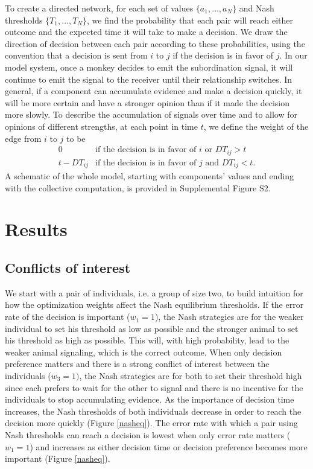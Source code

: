 \documentclass{pnastwo}
\begin{document}
\begin{article}
To create a directed network, for each set of values $\{a_1,\dots,a_N\}$ and Nash thresholds $\{T_1,\dots,T_N\}$, we find the probability that each pair will reach either outcome and the expected time it will take to make a decision.  We draw the direction of decision between each pair according to these probabilities, using the convention that a decision is sent from $i$ to $j$ if the decision is in favor of $j$.  In our model system, once a monkey decides to emit the subordination signal, it will continue to emit the signal to the receiver until their relationship switches.  In general, if a component can accumulate evidence and make a decision quickly, it will be more certain and have a stronger opinion than if it made the decision more slowly. To describe the accumulation of signals over time and to allow for opinions of different strengths, at each point in time $t$, we define the weight of the edge from $i$ to $j$ to be
$$
\begin{array}{ll}
0 & \text{if the decision is in favor of } i\text{ or } DT_{ij}>t 
\\t-DT_{ij} & \text{if the decision is in favor of } j\text{ and } DT_{ij}<t .
\end{array}
$$
A schematic of the whole model, starting with components' values and ending with the collective computation, is provided in Supplemental Figure S2.


\section{Results}
\subsection{Conflicts of interest}
We start with a pair of individuals, i.e. a group of size two, to build intuition for how the optimization weights affect the Nash equilibrium thresholds.  If the error rate of the decision is important ($w_1=1$), the Nash strategies are for the weaker individual to set his threshold as low as possible and the stronger animal to set his threshold as high as possible. This will, with high probability, lead to the weaker animal signaling, which is the correct outcome. When only decision preference matters and there is a strong conflict of interest between the individuals ($w_3=1)$, the Nash strategies are for both to set their threshold high since each prefers to wait for the other to signal and there is no incentive for the individuals to stop accumulating evidence. As the importance of decision time increases, the Nash thresholds of both individuals decrease in order to reach the decision more quickly (Figure \ref{nasheq}). The error rate with which a pair using Nash thresholds can reach a decision is lowest when only error rate matters ($w_1=1$) and increases as either decision time or decision preference becomes more important (Figure \ref{nasheq}).  



\end{article}
\end{document}
